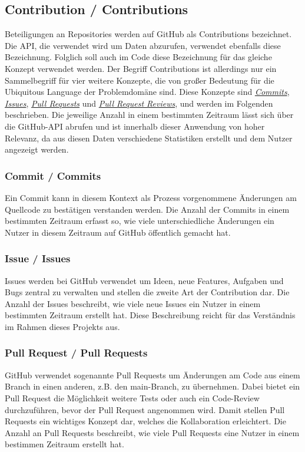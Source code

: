 \subsection*{Contribution / Contributions}
\label{sec:Contributions}
Beteiligungen an Repositories werden auf GitHub als Contributions bezeichnet. 
Die API, die verwendet wird um Daten abzurufen, verwendet ebenfalls diese Bezeichnung. 
Folglich soll auch im Code diese Bezeichnung für das gleiche Konzept verwendet werden.
\newline
Der Begriff Contributions ist allerdings nur ein Sammelbegriff für vier weitere Konzepte, die von großer Bedeutung für die Ubiquitous Language der Problemdomäne sind.
Diese Konzepte sind \hyperref[sec:Commits]{\textit{Commits}}, \hyperref[sec:Issues]{\textit{Issues}}, \hyperref[sec:PullRequests]{\textit{Pull Requests}} und \hyperref[sec:PullRequestReviews]{\textit{Pull Request Reviews}}, und werden im Folgenden beschrieben.
Die jeweilige Anzahl in einem bestimmten Zeitraum lässt sich über die GitHub-API abrufen und ist innerhalb dieser Anwendung von hoher Relevanz, da aus diesen Daten verschiedene Statistiken erstellt und dem Nutzer angezeigt werden.
\subsubsection*{Commit / Commits}
\label{sec:Commits}
Ein Commit kann in diesem Kontext als Prozess vorgenommene Änderungen am Quellcode zu bestätigen verstanden werden.
Die Anzahl der Commits in einem bestimmten Zeitraum erfasst so, wie viele unterschiedliche Änderungen ein Nutzer in diesem Zeitraum auf GitHub öffentlich gemacht hat. 
\subsubsection*{Issue / Issues}
\label{sec:Issues}
Issues werden bei GitHub verwendet um Ideen, neue Features, Aufgaben und Bugs zentral zu verwalten und stellen die zweite Art der Contribution dar.
Die Anzahl der Issues beschreibt, wie viele neue Issues ein Nutzer in einem bestimmten Zeitraum erstellt hat.
Diese Beschreibung reicht für das Verständnis im Rahmen dieses Projekts aus.
\subsubsection*{Pull Request / Pull Requests}
\label{sec:PullRequests}
GitHub verwendet sogenannte Pull Requests um Änderungen am Code aus einem Branch in einen anderen, z.B. den main-Branch, zu übernehmen.
Dabei bietet ein Pull Request die Möglichkeit weitere Tests oder auch ein Code-Review durchzuführen, bevor der Pull Request angenommen wird.
Damit stellen Pull Requests ein wichtiges Konzept dar, welches die Kollaboration erleichtert.
Die Anzahl an Pull Requests beschreibt, wie viele Pull Requests eine Nutzer in einem bestimmen Zeitraum erstellt hat.
